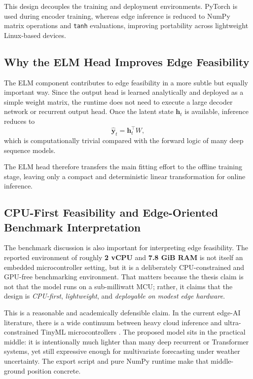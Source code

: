 This design decouples the training and deployment environments. PyTorch is used during encoder training, whereas edge inference is reduced to NumPy matrix operations and \texttt{tanh} evaluations, improving portability across lightweight Linux-based devices.

\subsection{Why the ELM Head Improves Edge Feasibility}

The ELM component contributes to edge feasibility in a more subtle but equally important way. Since the output head is learned analytically and deployed as a simple weight matrix, the runtime does not need to execute a large decoder network or recurrent output head. Once the latent state $\mathbf{h}_t$ is available, inference reduces to
\begin{equation}
	\hat{\mathbf{y}}_t = \mathbf{h}_t^{\top}W,
	\label{eq:edge_linear_head}
\end{equation}
which is computationally trivial compared with the forward logic of many deep sequence models.

The ELM head therefore transfers the main fitting effort to the offline training stage, leaving only a compact and deterministic linear transformation for online inference.

\subsection{CPU-First Feasibility and Edge-Oriented Benchmark Interpretation}

The benchmark discussion is also important for interpreting edge feasibility. The reported environment of roughly \textbf{2 vCPU} and \textbf{7.8 GiB RAM} is not itself an embedded microcontroller setting, but it is a deliberately CPU-constrained and GPU-free benchmarking environment. That matters because the thesis claim is not that the model runs on a sub-milliwatt MCU; rather, it claims that the design is \emph{CPU-first}, \emph{lightweight}, and \emph{deployable on modest edge hardware}.

This is a reasonable and academically defensible claim. In the current edge-AI literature, there is a wide continuum between heavy cloud inference and ultra-constrained TinyML microcontrollers \cite{antonini2023tinyml}. The proposed model sits in the practical middle: it is intentionally much lighter than many deep recurrent or Transformer systems, yet still expressive enough for multivariate forecasting under weather uncertainty. The export script and pure NumPy runtime make that middle-ground position concrete.


